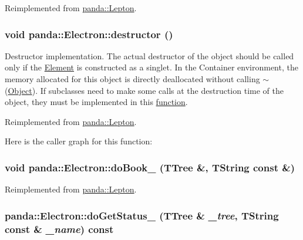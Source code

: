Reimplemented from \hyperlink{classpanda_1_1Lepton_a13fd748ab9e1b76e5cc8391723cc5ea7}{panda::Lepton}.\hypertarget{classpanda_1_1Electron_a9e9a34d904d5cc02ab895e73cdaf6d7f}{
\subsubsection[{destructor}]{\setlength{\rightskip}{0pt plus 5cm}void panda::Electron::destructor ()}}
\label{classpanda_1_1Electron_a9e9a34d904d5cc02ab895e73cdaf6d7f}


Destructor implementation. The actual destructor of the object should be called only if the \hyperlink{classpanda_1_1Element}{Element} is constructed as a singlet. In the Container environment, the memory allocated for this object is directly deallocated without calling $\sim$(\hyperlink{classpanda_1_1Object}{Object}). If subclasses need to make some calls at the destruction time of the object, they must be implemented in this \hyperlink{namespacepanda_1_1function}{function}. 

Reimplemented from \hyperlink{classpanda_1_1Lepton_af8bb4d531bdddbf51f479f7eb0dae175}{panda::Lepton}.

Here is the caller graph for this function:\hypertarget{classpanda_1_1Electron_a2b2000f57a7f009c12bdf33f25d50350}{
\subsubsection[{doBook\_\-}]{\setlength{\rightskip}{0pt plus 5cm}void panda::Electron::doBook\_\- (TTree \&, \/  TString const \&)}}
\label{classpanda_1_1Electron_a2b2000f57a7f009c12bdf33f25d50350}


Reimplemented from \hyperlink{classpanda_1_1Lepton_af9d74c974117a26f53e60da918cb84ba}{panda::Lepton}.\hypertarget{classpanda_1_1Electron_a3e2097c55d5ab63188d0c04426e47248}{
\subsubsection[{doGetStatus\_\-}]{ panda::Electron::doGetStatus\_\- (TTree \& {\em \_\-tree}, \/  TString const \& {\em \_\-name}) const}}
\label{classpanda_1_1Electron_a3e2097c55d5ab63188d0c04426e47248}


